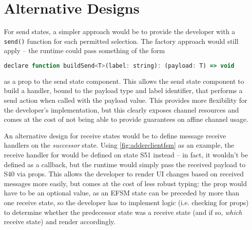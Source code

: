 \section{Alternative Designs}
\label{section:reactalt}

For send states, a simpler approach would be
to provide the developer with a \texttt{send()} function 
for each permitted selection.
The factory approach would still apply -- the runtime could pass something
of the form

\begin{lstlisting}[language=javascript, numbers=none]
declare function buildSend<T>(label: string): (payload: T) => void
\end{lstlisting}

as a prop to the send state component.
This allows the send state component to build a handler,
bound to the payload type and label identifier, that performs a 
send action when called with the payload value.
This provides more flexibility for the developer's implementation,
but this clearly exposes channel resources and 
comes at the cost of not being able to provide guarantees
on affine channel usage.

An alternative design for receive states
would be to define message receive handlers on the
\textit{successor} state.
Using \cref{fig:adderclientfsm} as an example,
the receive handler for 
would be defined on state S51 instead -- in fact, it wouldn't
be defined as a callback, but the runtime would simply pass
the received payload to S40 via props.
This allows the developer to render UI changes
based on received messages more easily, but comes at the
cost of less robust typing:
the  prop would have to be an optional value,
as an EFSM state can be preceded by more than one receive state,
so the developer has to implement logic (i.e. checking
for  props) to determine whether
the predecessor state was a receive state (and if so,
\textit{which} receive state) and render accordingly.